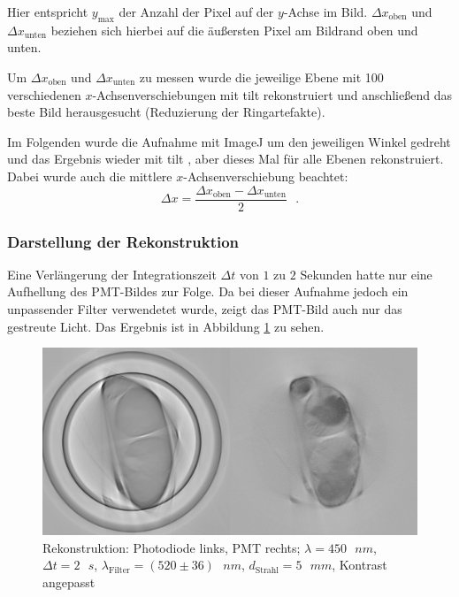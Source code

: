 Hier entspricht $y_\text{max}$ der Anzahl der Pixel auf der $y$-Achse im Bild.
$\Delta{x_\text{oben}}$ und $\Delta{x_\text{unten}}$ beziehen sich hierbei auf die äußersten Pixel am Bildrand oben und unten.

Um $\Delta{x_{\text{oben}}}$ und $\Delta{x_{\text{unten}}}$ zu messen wurde die jeweilige Ebene mit 100 verschiedenen $x$-Achsenverschiebungen mit  \glqq tilt\grqq{} rekonstruiert und anschließend das beste Bild herausgesucht (Reduzierung der Ringartefakte).

Im Folgenden wurde die Aufnahme mit \glqq ImageJ\grqq{} um den jeweiligen Winkel gedreht und das Ergebnis wieder mit  \glqq tilt\grqq{} , aber dieses Mal für alle Ebenen rekonstruiert.
Dabei wurde auch die mittlere $x$-Achsenverschiebung beachtet:
$$\Delta{x} = \frac{\Delta{x_{\text{oben}}} - \Delta{x_{\text{unten}}}}{2}\text{ }.$$

\subsubsection{Darstellung der Rekonstruktion}
Eine Verlängerung der Integrationszeit $\Delta{t}$ von $1$ zu $2$ Sekunden hatte nur eine Aufhellung des PMT-Bildes zur Folge.
Da bei dieser Aufnahme jedoch ein unpassender Filter verwendetet wurde, zeigt das PMT-Bild auch nur das gestreute Licht. Das Ergebnis ist in Abbildung \ref{fig:lang-int} zu sehen.

\begin{figure}[ht]
\centering
\includegraphics[width=\linewidth]{IMAGE/both-2-450-5-1-c.png}
\caption{Rekonstruktion: Photodiode links, PMT rechts; $\lambda = 450 \text{ } \si{nm}$, $\Delta{t} = 2 \text{ } \si{s}$, $\lambda_\text{Filter} = (520 \pm 36) \text{ } \si{nm}$, $d_\text{Strahl} = 5 \text{ } \si{mm}$, Kontrast angepasst}
	\label{fig:lang-int}
\end{figure}

